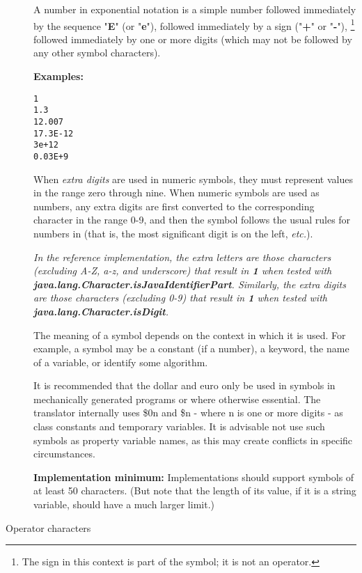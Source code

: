 \begin{description}
A number in exponential notation is a simple number followed immediately
by the sequence "\textbf{E}" (or "\textbf{e}"), followed
immediately by a sign ("\textbf{+}" or "\textbf{-}"),
\footnote{
The sign in this context is part of the symbol; it is not an
operator.
}
followed immediately by one or more digits (which may not be followed by
any other symbol characters).
 
\textbf{Examples:}
\begin{lstlisting}
1
1.3
12.007
17.3E-12
3e+12
0.03E+9
\end{lstlisting}
 
When \emph{extra digits} are used in numeric symbols, they must
represent values in the range zero through nine.
When numeric symbols are used as numbers, any extra digits are first
converted to the corresponding character in the range 0-9, and then the
symbol follows the usual rules for numbers in \nr{} (that is, the most
significant digit is on the left, \emph{etc.}).
 
\emph{In the reference implementation, the extra letters are those
characters (excluding A-Z, a-z, and underscore) that result
in \textbf{1} when tested with
\\\textbf{java.lang.Character.isJavaIdentifierPart}.
Similarly, the extra digits are those characters (excluding 0-9) that
result in \textbf{1} when tested with \textbf{java.lang.Character.isDigit}.
}
 
The meaning of a symbol depends on the context in which it is used.
For example, a symbol may be a constant (if a number), a keyword, the
name of a variable, or identify some algorithm.
 
It is recommended that the dollar and euro only be used in symbols in
mechanically generated programs or where otherwise essential. The \nr{} translator 
internally uses \$0n and \$n - where n is one or more digits - as class constants and 
temporary variables. It is advisable not use such symbols as property variable names,
as this may create conflicts in specific circumstances.

\textbf{Implementation minimum:} Implementations should support
symbols of at least 50 characters.
(But note that the length of its value, if it is a string variable,
should have a much larger limit.)
\item[Operator characters]\label{refopers}


\end{description}
